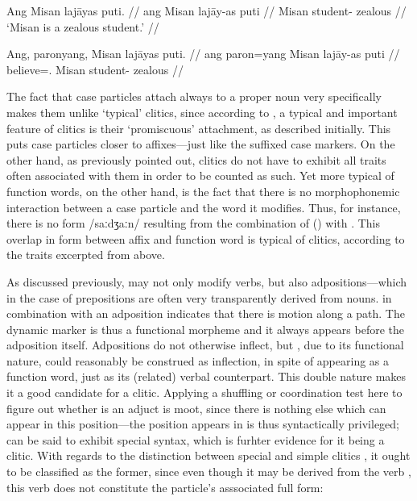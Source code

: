 \pex\label{ex:clitics_11}
\a\label{ex:clitics_11a}\begingl
	\gla Ang Misan lajāyas puti. //
	\glb ang Misan lajāy-as puti //
	\glc \Aarg{} Misan student-\Parg{} zealous //
	\glft `Misan is a zealous student.' //
\endgl

\a\label{ex:clitics_11b}\ljudge{*}\begingl
	\gla Ang, paronyang, Misan lajāyas puti. //
	\glb ang paron=yang Misan lajāy-as puti //
	\glc \Aarg{} believe=\Fsg{}.\Aarg{} Misan student-\Parg{} zealous //
\endgl
\xe

The fact that case particles attach always to a proper noun very specifically
makes them unlike `typical' clitics, since according to
\citet{spencerluis2012}, a typical and important feature of clitics is their
`promiscuous' attachment, as described initially. This puts case particles
closer to affixes---just like the suffixed case markers. On the other hand, as
previously pointed out, clitics do not have to exhibit all traits often
associated with them in order to be counted as such. Yet more typical of
function words, on the other hand, is the fact that there is no morphophonemic
interaction between a case particle and the word it modifies. Thus, for
instance, there is no form /saːdʒaːn/ resulting from the combination of
 (\Parg{}) with . This overlap in form between
affix and function word is typical of clitics, according to the traits
excerpted from \citet{spencerluis2012} above.

As discussed previously,  may not only modify verbs, but also
ad\-posi\-tions---which in the case of prepositions are often very
transparently derived from nouns.  in combination with an
adposition indicates that there is motion along a path. The dynamic marker
 is thus a functional morpheme and it always appears before the
adposition itself. Adpositions do not otherwise inflect, but ,
due to its functional nature, could reasonably be construed as inflection, in
spite of appearing as a function word, just as its (related) verbal
counterpart. This double nature makes it a good candidate for a clitic.
Applying a shuffling or coordination test here to figure out whether
 is an adjuct is moot, since there is nothing else which can
appear in this position---the position  appears in is thus
syntactically privileged;  can be said to exhibit special
syntax, which is furhter evidence for it being a clitic. With regards to the
distinction between special and simple clitics \citep{zwicky1977}, it ought to
be classified as the former, since even though it may be derived from the verb
, this verb does not constitute the particle's asssociated full
form:


